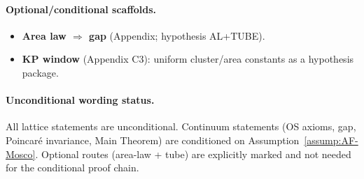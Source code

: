 \documentclass[11pt]{amsart}
\theoremstyle{plain}
\theoremstyle{definition}
\theoremstyle{remark}
\begin{document}
\paragraph{Optional/conditional scaffolds.}
\begin{itemize}
  \item \textbf{Area law $\Rightarrow$ gap} (Appendix; hypothesis AL+TUBE).
  \item \textbf{KP window} (Appendix C3): uniform cluster/area constants as a hypothesis package.
\end{itemize}
\paragraph{Unconditional wording status.}
All lattice statements are unconditional. Continuum statements (OS axioms, gap, Poincar\'e invariance, Main Theorem) are conditioned on Assumption~\ref{assump:AF-Mosco}. Optional routes (area-law + tube) are explicitly marked and not needed for the conditional proof chain.
\end{document}
